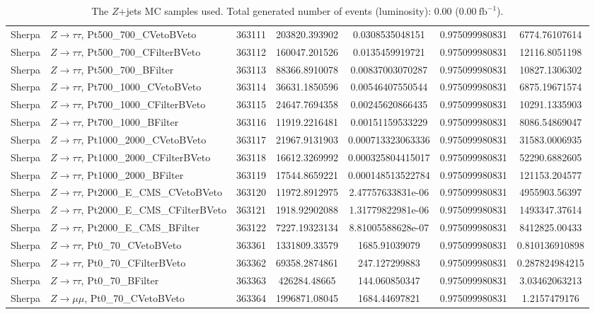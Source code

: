 \begin{table}[h]
\begin{center}
\begin{tabular}{|l|l|c|
S[table-parse-only, round-precision=4]|
S[table-parse-only, round-precision=3]|
S[table-parse-only, round-precision=3]|
S[table-parse-only, round-precision=3]|
}
Sherpa & $Z\rightarrow\tau\tau$, Pt500\_700\_CVetoBVeto & 363111 & 203820.393902 & 0.0308535048151 & 0.975099980831 & 6774.76107614 \\
Sherpa & $Z\rightarrow\tau\tau$, Pt500\_700\_CFilterBVeto & 363112 & 160047.201526 & 0.0135459919721 & 0.975099980831 & 12116.8051198 \\
Sherpa & $Z\rightarrow\tau\tau$, Pt500\_700\_BFilter & 363113 & 88366.8910078 & 0.00837003070287 & 0.975099980831 & 10827.1306302 \\
Sherpa & $Z\rightarrow\tau\tau$, Pt700\_1000\_CVetoBVeto & 363114 & 36631.1850596 & 0.00546407550544 & 0.975099980831 & 6875.19671574 \\
Sherpa & $Z\rightarrow\tau\tau$, Pt700\_1000\_CFilterBVeto & 363115 & 24647.7694358 & 0.00245620866435 & 0.975099980831 & 10291.1335903 \\
Sherpa & $Z\rightarrow\tau\tau$, Pt700\_1000\_BFilter & 363116 & 11919.2216481 & 0.00151159533229 & 0.975099980831 & 8086.54869047 \\
Sherpa & $Z\rightarrow\tau\tau$, Pt1000\_2000\_CVetoBVeto & 363117 & 21967.9131903 & 0.000713323063336 & 0.975099980831 & 31583.0006935 \\
Sherpa & $Z\rightarrow\tau\tau$, Pt1000\_2000\_CFilterBVeto & 363118 & 16612.3269992 & 0.000325804415017 & 0.975099980831 & 52290.6882605 \\
Sherpa & $Z\rightarrow\tau\tau$, Pt1000\_2000\_BFilter & 363119 & 17544.8659221 & 0.000148513522784 & 0.975099980831 & 121153.204577 \\
Sherpa & $Z\rightarrow\tau\tau$, Pt2000\_E\_CMS\_CVetoBVeto & 363120 & 11972.8912975 & 2.47757633831e-06 & 0.975099980831 & 4955903.56397 \\
Sherpa & $Z\rightarrow\tau\tau$, Pt2000\_E\_CMS\_CFilterBVeto & 363121 & 1918.92902088 & 1.31779822981e-06 & 0.975099980831 & 1493347.37614 \\
Sherpa & $Z\rightarrow\tau\tau$, Pt2000\_E\_CMS\_BFilter & 363122 & 7227.19323134 & 8.81005588628e-07 & 0.975099980831 & 8412825.00433 \\
Sherpa & $Z\rightarrow\tau\tau$, Pt0\_70\_CVetoBVeto & 363361 & 1331809.33579 & 1685.91039079 & 0.975099980831 & 0.810136910898 \\
Sherpa & $Z\rightarrow\tau\tau$, Pt0\_70\_CFilterBVeto & 363362 & 69358.2874861 & 247.127299883 & 0.975099980831 & 0.287824984215 \\
Sherpa & $Z\rightarrow\tau\tau$, Pt0\_70\_BFilter & 363363 & 426284.48665 & 144.060850347 & 0.975099980831 & 3.03462063213 \\
Sherpa & $Z\rightarrow\mu\mu$, Pt0\_70\_CVetoBVeto & 363364 & 1996871.08045 & 1684.44697821 & 0.975099980831 & 1.2157479176 \\
\bottomrule
\end{tabular}
\caption{The $Z$+jets MC samples used. Total generated number of events (luminosity): 0.00 (0.00$~\mathrm{fb}^{-1}$).}
\label{tab:app:datamcZ_sherpa_220}
\end{center}
\end{table}
